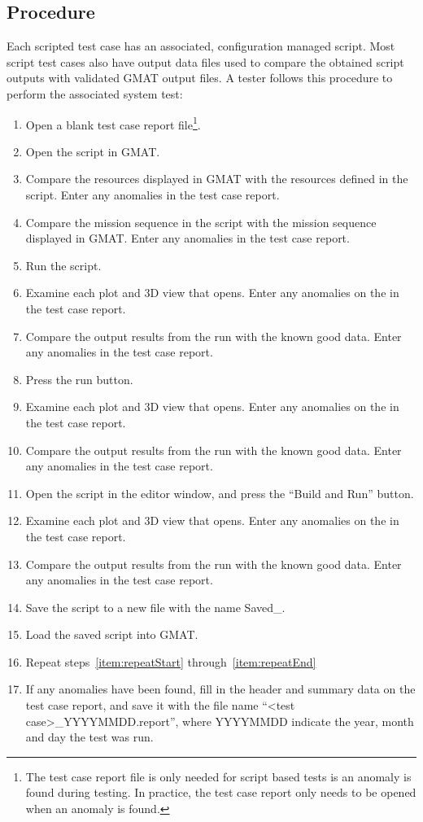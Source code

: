 \subsection{Procedure}

Each scripted test case has an associated, configuration managed script.  Most script test cases also have output data files used to compare the obtained script outputs with validated GMAT output files.  A tester follows this procedure to perform the associated system test:

\begin{enumerate}
\item Open a blank test case report file\footnote{The test case report file is only needed for
script based tests is an anomaly is found during testing.  In practice, the test case report only
needs to be opened when an anomaly is found.}.
\item Open the script in GMAT.
\item\label{item:repeatStart} Compare the resources displayed in GMAT with the resources defined in the script. Enter any anomalies in the test case report.
\item Compare the mission sequence in the script with the mission sequence displayed in GMAT.
Enter any anomalies in the test case report.
\item Run the script.
\item Examine each plot and 3D view that opens.  Enter any anomalies on the in the test case report.
\item Compare the output results from the run with the known good data.  Enter any anomalies in the test case report.
\item Press the run button.
\item Examine each plot and 3D view that opens.  Enter any anomalies on the in the test case report.
\item Compare the output results from the run with the known good data.  Enter any anomalies in the test case report.
\item\label{item:repeatEnd} Open the script in the editor window, and press the ``Build and Run''
button.
\item Examine each plot and 3D view that opens.  Enter any anomalies on the in the test case report.
\item Compare the output results from the run with the known good data.  Enter any anomalies in the test case report.
\item Save the script to a new file with the name Saved\_<Test case name>.
\item Load the saved script into GMAT.
\item Repeat steps~\ref{item:repeatStart} through~\ref{item:repeatEnd}
\item If any anomalies have been found, fill in the header and summary data on the test case
report, and save it with the file name ``<test case>\_YYYYMMDD.report'', where YYYYMMDD indicate
the year, month and day the test was run.
\end{enumerate}

